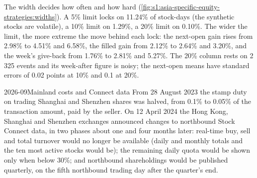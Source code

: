 \begin{omfigure}

\label{fig:s1:asia-specific-equity-strategies:widths}
\end{omfigure}

The width decides how often and how hard (\cref{fig:s1:asia-specific-equity-strategies:widths}). A 5\% limit locks on 11.24\% of stock-days (the
synthetic stocks are volatile), a 10\% limit on 1.29\%, a 20\% limit on 0.10\%. The wider the limit, the more extreme the move behind each lock: the
next-open gain rises from 2.98\% to 4.51\% and 6.58\%, the filled gain from 2.12\% to 2.64\% and 3.20\%, and the week's give-back from 1.76\% to 2.81\% and
5.27\%. The 20\% column rests on 2\,325 events and its week-after figure is noisy; the next-open means have standard errors of 0.02 points at 10\% and
0.1 at 20\%.

\begin{dated}{2026-09}{Mainland costs and Connect data}\label{dat:s1:asia-specific-equity-strategies:connect}
From 28 August 2023 the stamp duty on trading Shanghai and Shenzhen shares was halved, from 0.1\% to 0.05\% of the transaction amount, paid by the
seller. On 12 April 2024 the Hong Kong, Shanghai and Shenzhen exchanges announced changes to northbound Stock Connect data, in two phases about one
and four months later: real-time buy, sell and total turnover would no longer be available (daily and monthly totals and the ten most active stocks
would be); the remaining daily quota would be shown only when below 30\%; and northbound shareholdings would be published quarterly, on the fifth
northbound trading day after the quarter's end.
\end{dated}

